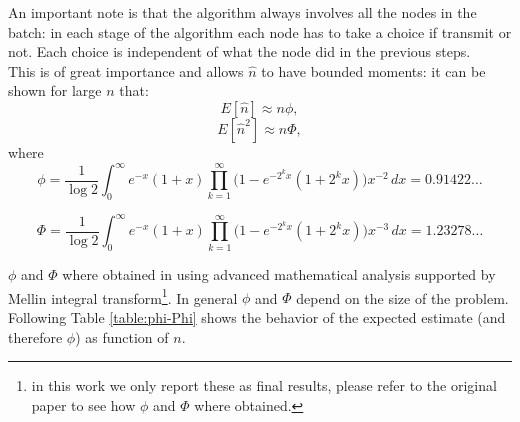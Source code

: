 \documentclass[11pt,a4paper,twoside,openright]{book}
\begin{document}
An important note is that the algorithm always involves all the nodes in the batch: in each stage of the algorithm each node has to take a choice if transmit or not. 
Each choice is independent of what the node did in the previous steps. \\ 
This is of great importance and allows $\hat{n}$ to have bounded moments: it can be shown for large $n$ that:
\begin{equation}
E[\hat{n}] \approx n\phi,
\end{equation}
\begin{equation}
E[\hat{n}^{2}] \approx n\Phi,
\end{equation}
where
\begin{equation}
\phi= \frac{1}{\log2} \int_{0}^{\infty} \! e^{-x}(1+x) \prod_{k=1}^{\infty}\bigl(1-e^{-2^{k}x}(1+2^{k}x)\bigr)x^{-2} \, dx = 0.91422\dots
\end{equation}

\begin{equation}
\Phi= \frac{1}{\log2} \int_{0}^{\infty} \! e^{-x}(1+x) \prod_{k=1}^{\infty}\bigl(1-e^{-2^{k}x}(1+2^{k}x)\bigr)x^{-3} \, dx =1.23278\dots
\end{equation}

\noindent $\phi$ and $\Phi$ where obtained in \cite{greenberg87} using advanced mathematical analysis supported by Mellin integral transform\footnote{in this work we only report these as final results, please refer to the original paper to see how $\phi$ and $\Phi$ where obtained.}.
In general $\phi$ and $\Phi$ depend on the size of the problem. Following Table \ref{table:phi-Phi} shows the behavior of the expected estimate (and therefore $\phi$) as function of $n$.\\
\end{document}
